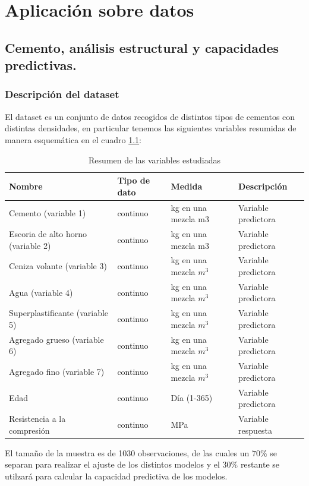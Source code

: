 \chapter{Aplicación sobre datos}

\section{Cemento, análisis estructural y capacidades predictivas.}
\subsection*{Descripción del dataset}
\noindent El dataset  \cite{Yeh 2007} es un conjunto de datos recogidos de distintos tipos de cementos con distintas densidades, en particular tenemos las siguientes variables resumidas de manera esquemática en el cuadro \ref{tab:Resumen Variables}:
\begin{table}[h]
\footnotesize
\centering
\begin{tabular}{|l|l|l|l|}
\hline
Nombre & Tipo de dato & Medida & Descripción \\
\hline
Cemento (variable 1) & continuo & kg en una mezcla m3 & Variable predictora \\
Escoria de alto horno (variable 2) & continuo & kg en una mezcla m3 & Variable predictora \\
Ceniza volante (variable 3) & continuo & kg en una mezcla $m^3$ & Variable predictora \\
Agua (variable 4) & continuo & kg en una mezcla $m^3$ & Variable predictora \\
Superplastificante (variable 5) & continuo & kg en una mezcla $m^3$ & Variable predictora \\
Agregado grueso (variable 6) & continuo & kg en una mezcla $m^3$ & Variable predictora \\
Agregado fino (variable 7) & continuo & kg en una mezcla $m^3$ & Variable predictora \\
Edad & continuo & Día (1-365) & Variable predictora \\
Resistencia a la compresión & continuo & MPa & Variable respuesta \\
\hline
\end{tabular}
\caption{Resumen de las variables estudiadas}
\label{tab:Resumen Variables}
\end{table}




\noindent El tamaño de la muestra es de 1030 observaciones, de las cuales un $70\%$ se separan para realizar el ajuste de los distintos modelos y el $30\%$ restante se utilzará para calcular la capacidad predictiva de los modelos. 

